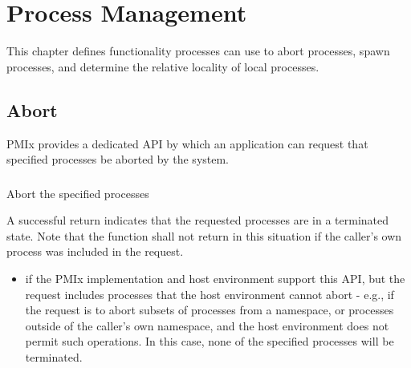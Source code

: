 \chapter{Process Management}
\label{chap:api_proc_mgmt}

This chapter defines functionality processes can use to abort processes, spawn processes, and determine the relative locality of local processes.

\section{Abort}
\label{chap:api_proc_mgmt:abort}

\ac{PMIx} provides a dedicated API by which an application can request that specified processes be aborted by the system.

\subsection{}

\summary

Abort the specified processes

\format


\begin{arglist}
\end{arglist}

A successful return indicates that the requested processes are in a terminated state.  Note that the function shall not return in this situation if the caller's own process was included in the request.

\returnstart
\begin{itemize}
    \item {} if the \ac{PMIx} implementation and host environment support this \ac{API}, but the request includes processes that the host environment cannot abort - e.g., if the request is to abort subsets of processes from a namespace, or processes outside of the caller's own namespace, and the host environment does not permit such operations. In this case, none of the specified processes will be terminated.
\end{itemize}
\returnend

